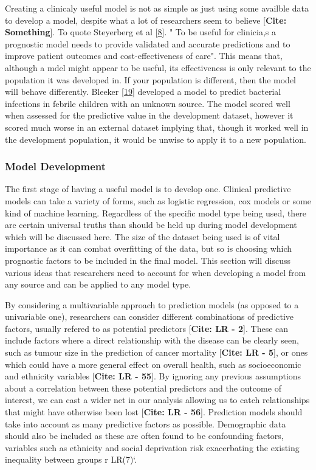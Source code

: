 \documentclass[12pt,PhD,twoside,openright]{muthesis}
\begin{document}
Creating a clinicaly useful model is not as simple as just using some availble data to develop a model, despite what a lot of researchers seem to believe {[}\textbf{Cite: Something}{]}. To quote Steyerberg et al {[}\protect\hyperlink{ref-steyerberg_prognosis_2013}{8}{]}. " To be useful for clinicia,s a prognostic model needs to provide validated and accurate predictions and to improve patient outcomes and cost-effectiveness of care". This means that, although a mdel might appear to be useful, its effectiveness is only relevant to the population it was developed in. If your population is different, then the model will behave differently. Bleeker {[}\protect\hyperlink{ref-bleeker_external_2003}{19}{]} developed a model to predict bacterial infections in febrile children with an unknown source. The model scored well when assessed for the predictive value in the development dataset, however it scored much worse in an external dataset implying that, though it worked well in the development population, it would be unwise to apply it to a new population.

\hypertarget{model-development}{%
\subsubsection{Model Development}\label{model-development}}

The first stage of having a useful model is to develop one. Clinical predictive models can take a variety of forms, such as logistic regression, cox models or some kind of machine learning. Regardless of the specific model type being used, there are certain universal truths than should be held up during model development which will be discussed here. The size of the dataset being used is of vital importance as it can combat overfitting of the data, but so is choosing which prognostic factors to be included in the final model. This section will discuss various ideas that researchers need to account for when developing a model from any source and can be applied to any model type.

By considering a multivariable approach to prediction models (as opposed to a univariable one), researchers can consider different combinations of predictive factors, usually refered to as potential predictors {[}\textbf{Cite: LR - 2}{]}. These can include factors where a direct relationship with the disease can be clearly seen, such as tumour size in the prediction of cancer mortality {[}\textbf{Cite: LR - 5}{]}, or ones which could have a more general effect on overall health, such as socioeconomic and ethnicity variables {[}\textbf{Cite: LR - 55}{]}. By ignoring any previous assumptions about a correlation between these potential predictors and the outcome of interest, we can cast a wider net in our analysis allowing us to catch relationships that might have otherwise been lost {[}\textbf{Cite: LR - 56}{]}. Prediction models should take into account as many predictive factors as possible. Demographic data should also be included as these are often found to be confounding factors, variables such as ethnicity and social deprivation risk exacerbating the existing inequality between groups r LR(7)`.
\end{document}
